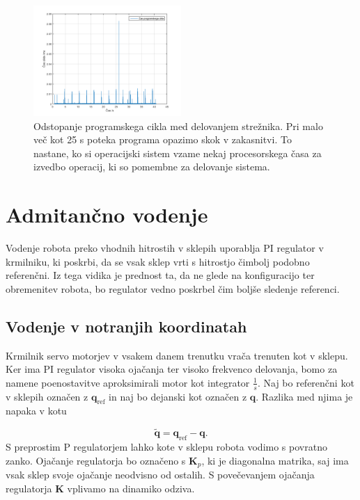 \documentclass[a4paper]{article}
\begin{document}
\begin{figure}[!h]
	\centering
	\includegraphics[width=0.5\textwidth]{./slike/figure_jitter}
	\caption{Odstopanje programskega cikla med delovanjem strežnika. Pri malo več kot 25 s poteka programa opazimo skok v zakasnitvi. To nastane, ko si operacijski sistem vzame nekaj procesorskega časa za izvedbo operacij, ki so pomembne za delovanje sistema.}
	\label{fig:jittergraph}
	
\end{figure}

\section{Admitančno vodenje}

Vodenje robota preko vhodnih hitrostih v sklepih uporablja PI regulator v krmilniku, ki poskrbi, da se vsak sklep vrti s hitrostjo čimbolj podobno referenčni. Iz tega vidika je prednost ta, da ne glede na konfiguracijo ter obremenitev robota, bo regulator vedno poskrbel čim boljše sledenje referenci. 


\subsection{Vodenje v notranjih koordinatah} \label{sec:admit_inner}

Krmilnik servo motorjev v vsakem danem trenutku vrača trenuten kot v sklepu. Ker ima PI regulator visoka ojačanja ter visoko frekvenco delovanja, bomo za namene poenostavitve aproksimirali motor kot integrator $\frac{1}{s}$. Naj bo referenčni kot v sklepih označen z $\textbf{q}_{\mathrm{ref}}$ in naj bo dejanski kot označen z $\textbf{q}$. Razlika med njima je napaka v kotu 

\begin{equation}
\tilde{\textbf{q}} = \textbf{q}_{\mathrm{ref}} - \textbf{q}.
\end{equation}
S preprostim P regulatorjem lahko kote v sklepu robota vodimo s povratno zanko. Ojačanje regulatorja bo označe\-no s $\textbf{K}_p$, ki je diagonalna matrika, saj ima vsak sklep svoje ojačanje neodvisno od ostalih. S povečevanjem ojačanja regulatorja \textbf{K} vplivamo na dinamiko odziva.
\end{document}
